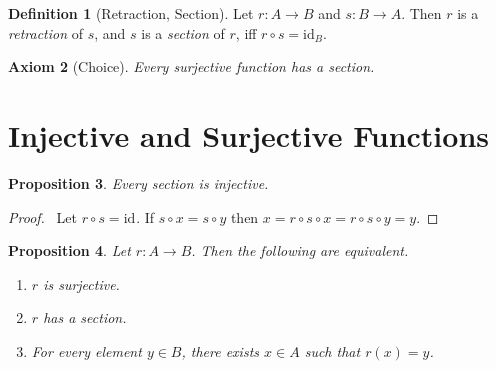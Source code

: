 \documentclass{book}
\let\qed\relax
\newtheorem{ax}{Axiom}[chapter]
\newtheorem{prop}[ax]{Proposition}
\theoremstyle{definition}
\newtheorem{df}[ax]{Definition}
\newcommand{\id}[1]{\ensuremath{\mathrm{id}_{#1}}}
\begin{document}
\begin{df}[Retraction, Section]
Let $r : A \rightarrow B$ and $s : B \rightarrow A$. Then $r$ is a \emph{retraction} of $s$, and $s$ is a \emph{section} of $r$, iff $r \circ s = \id{B}$.
\end{df}

\begin{ax}[Choice]
Every surjective function has a section.
\end{ax}

\section{Injective and Surjective Functions}

\begin{prop}
Every section is injective.
\end{prop}

\begin{proof}
\pf\ Let $r \circ s = \id{}$. If $s \circ x = s \circ y$ then $x = r \circ s \circ x = r \circ s \circ y = y$. \qed
\end{proof}

\begin{prop}
Let $r : A \rightarrow B$. Then the following are equivalent.
\begin{enumerate}
\item $r$ is surjective.
\item $r$ has a section.
\item For every element $y \in B$, there exists $x \in A$ such that $r(x) = y$.
\end{enumerate}
\end{prop}
\end{document}
